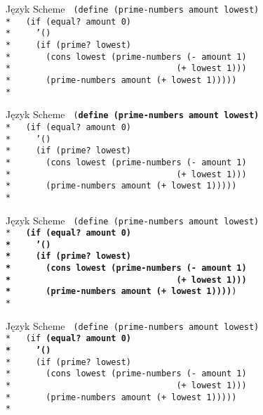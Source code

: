 \begin{frame}{Język Scheme}
  \texttt{
(define (prime-numbers amount lowest)\\*
\ \ (if (equal?\ amount 0)\\*
\ \ \ \ '()\\*
\ \ \ \ (if (prime?\ lowest)\\*
\ \ \ \ \ \ (cons lowest (prime-numbers (- amount 1)\\*
\ \ \ \ \ \ \ \ \ \ \ \ \ \ \ \ \
\ \ \ \ \ \ \ \ \ \ \ \ \ \ \ (+ lowest 1)))\\*
\ \ \ \ \ \ (prime-numbers amount (+ lowest 1)))))\\*
  }
\end{frame}

\begin{frame}{Język Scheme}
  \texttt{
(\textbf{define (prime-numbers amount lowest)}\\*
\ \ (if (equal?\ amount 0)\\*
\ \ \ \ '()\\*
\ \ \ \ (if (prime?\ lowest)\\*
\ \ \ \ \ \ (cons lowest (prime-numbers (- amount 1)\\*
\ \ \ \ \ \ \ \ \ \ \ \ \ \ \ \ \
\ \ \ \ \ \ \ \ \ \ \ \ \ \ \ (+ lowest 1)))\\*
\ \ \ \ \ \ (prime-numbers amount (+ lowest 1)))))\\*
  }
\end{frame}

\begin{frame}{Język Scheme}
  \texttt{
(define (prime-numbers amount lowest)\\*
\ \ \textbf{(if (equal?\ amount 0)\\*
\ \ \ \ '()\\*
\ \ \ \ (if (prime?\ lowest)\\*
\ \ \ \ \ \ (cons lowest (prime-numbers (- amount 1)\\*
\ \ \ \ \ \ \ \ \ \ \ \ \ \ \ \ \
\ \ \ \ \ \ \ \ \ \ \ \ \ \ \ (+ lowest 1)))\\*
\ \ \ \ \ \ (prime-numbers amount (+ lowest 1))))})\\*
  }
\end{frame}

\begin{frame}{Język Scheme}
  \texttt{
(define (prime-numbers amount lowest)\\*
\ \ (if \textbf{(equal?\ amount 0)\\*
\ \ \ \ '()}\\*
\ \ \ \ (if (prime?\ lowest)\\*
\ \ \ \ \ \ (cons lowest (prime-numbers (- amount 1)\\*
\ \ \ \ \ \ \ \ \ \ \ \ \ \ \ \ \
\ \ \ \ \ \ \ \ \ \ \ \ \ \ \ (+ lowest 1)))\\*
\ \ \ \ \ \ (prime-numbers amount (+ lowest 1)))))\\*
  }
\end{frame}


